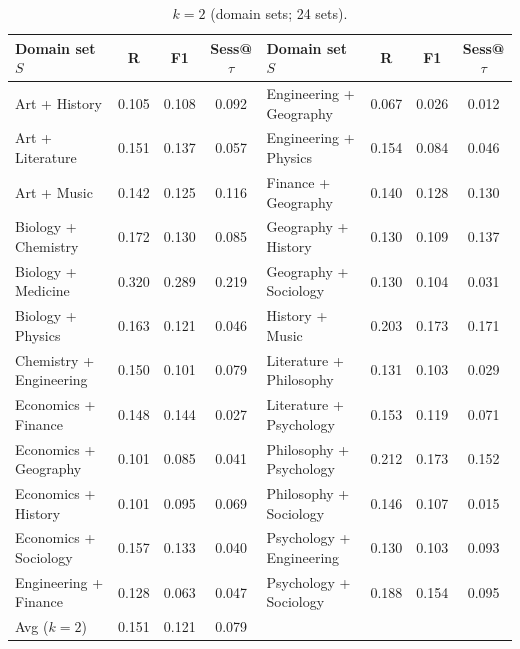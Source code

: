 \begin{table}[!ht]
\begin{subtable}[t]{\textwidth}
\caption{$k{=}2$ (domain sets; 24 sets).}
\centering
\begin{tabular}{lccc@{\hspace{1.5em}}lccc}
\toprule
Domain set $S$ &
R & F1 &
Sess@$\tau$ &
Domain set $S$ &
R & F1 &
Sess@$\tau$ \\
\midrule
Art + History                                      & 0.105 & 0.108 & 0.092 &
Engineering + Geography                            & 0.067 & 0.026 & 0.012 \\
Art + Literature                                   & 0.151 & 0.137 & 0.057 &
Engineering + Physics                              & 0.154 & 0.084 & 0.046 \\
Art + Music                                        & 0.142 & 0.125 & 0.116 &
Finance + Geography                                & 0.140 & 0.128 & 0.130 \\
Biology + Chemistry                                & 0.172 & 0.130 & 0.085 &
Geography + History                                & 0.130 & 0.109 & 0.137 \\
Biology + Medicine                                 & 0.320 & 0.289 & 0.219 &
Geography + Sociology                              & 0.130 & 0.104 & 0.031 \\
Biology + Physics                                  & 0.163 & 0.121 & 0.046 &
History + Music                                    & 0.203 & 0.173 & 0.171 \\
Chemistry + Engineering                            & 0.150 & 0.101 & 0.079 &
Literature + Philosophy                            & 0.131 & 0.103 & 0.029 \\
Economics + Finance                                & 0.148 & 0.144 & 0.027 &
Literature + Psychology                            & 0.153 & 0.119 & 0.071 \\
Economics + Geography                              & 0.101 & 0.085 & 0.041 &
Philosophy + Psychology                            & 0.212 & 0.173 & 0.152 \\
Economics + History                                & 0.101 & 0.095 & 0.069 &
Philosophy + Sociology                             & 0.146 & 0.107 & 0.015 \\
Economics + Sociology                              & 0.157 & 0.133 & 0.040 &
Psychology + Engineering                           & 0.130 & 0.103 & 0.093 \\
Engineering + Finance                              & 0.128 & 0.063 & 0.047 &
Psychology + Sociology                             & 0.188 & 0.154 & 0.095 \\
\midrule
Avg ($k{=}2$) & 0.151 & 0.121 & 0.079 & & & & \\
\bottomrule
\end{tabular}
\end{subtable}
\label{tab:d4_k12}
\end{table}

